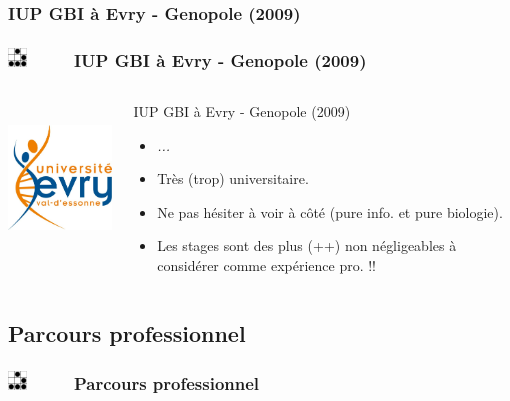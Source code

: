 \documentclass[slidetop,11pt]{beamer}
\def\sectionPartIIaTR{IUP GBI {\`a} Evry - Genopole (2009)} %
\def\sectionPartIIb{Parcours professionnel}
\def\moreInFrameTitle{\includegraphics[height=0.5cm]{img/logo_glider.png}~~~~~}
\begin{document}
\subsubsection{\sectionPartIIaTR}
\begin{frame}
	\frametitle{\moreInFrameTitle \sectionPartIIaTR}
	\begin{columns}[T]
	\begin{column}[T]{5cm}
		\includegraphics[height=4cm]{img/logo_ueve_2010.png}
	\end{column}
	\begin{column}[T]{7cm}
		\begin{beamerboxesrounded}	[lower=substructureTR, %
		 				 upper=block title TR,%
						 shadow=true]%
		       {\sectionPartIIaTR}
			\begin{itemize}
				\item \emph{...}
				\item Tr{\`e}s (trop) universitaire. 
				\item Ne pas h{\'e}siter {\`a} voir {\`a} c{\^o}t{\'e} (pure info. et pure biologie). 
				\item Les stages sont des plus (++) non n{\'e}gligeables {\`a} consid{\'e}rer comme exp{\'e}rience pro. !!
			\end{itemize}
		\end{beamerboxesrounded}
	\end{column}
	\end{columns}
\end{frame}

\subsection{\sectionPartIIb}
\begin{frame}
	\frametitle{\moreInFrameTitle \sectionPartIIb}
	\tableofcontents[sections=1,subsectionstyle=show/shaded/hide,subsubsectionstyle=show/show/hide]
\end{frame}
\end{document}
